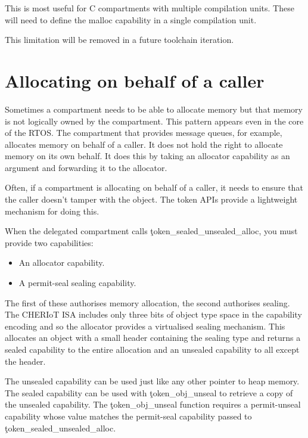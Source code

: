 This is most useful for C compartments with multiple compilation units.
These will need to define the malloc capability in a single compilation unit.

\begin{note}
This limitation will be removed in a future toolchain iteration.
\end{note}

\section[label=token_apis]{Allocating on behalf of a caller}

Sometimes a compartment needs to be able to allocate memory but that memory is not logically owned by the compartment.
This pattern appears even in the core of the RTOS.
The compartment that provides message queues, for example, allocates memory on behalf of a caller. 
It does not hold the right to allocate memory on its own behalf.
It does this by taking an allocator capability as an argument and forwarding it to the allocator.

Often, if a compartment is allocating on behalf of a caller, it needs to ensure that the caller doesn't tamper with the object.
The token APIs provide a lightweight mechanism for doing this.




When the delegated compartment calls \c{token_sealed_unsealed_alloc}, you must provide two capabilities:

\begin{itemize}
	\item{An allocator capability.}
	\item{A permit-seal sealing capability.}
\end{itemize}

The first of these authorises memory allocation, the second authorises sealing.
The CHERIoT ISA includes only three bits of object type space in the capability encoding and so the allocator provides a virtualised sealing mechanism.
This allocates an object with a small header containing the sealing type and returns a sealed capability to the entire allocation and an unsealed capability to all except the header.

The unsealed capability can be used just like any other pointer to heap memory.
The sealed capability can be used with \c{token_obj_unseal} to retrieve a copy of the unsealed capability.
The \c{token_obj_unseal} function requires a permit-unseal capability whose value matches the permit-seal capability passed to \c{token_sealed_unsealed_alloc}.

